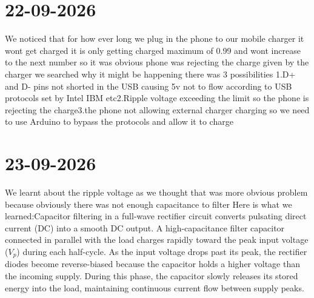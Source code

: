 \documentclass{article}
\begin{document}
	\section{22-09-2026}
	We noticed that for how ever long we plug in the phone to our mobile charger it wont get charged it is only getting charged maximum of 0.99 and wont increase to the next number so it was obvious phone was rejecting the charge given by the charger we searched why it might be happening there was 3 possibilities \newline 1.D+ and D- pins not shorted in the USB causing 5v not to flow according to USB protocols set by Intel IBM etc\newline 2.Ripple voltage exceeding the limit so the phone is rejecting the charge\newline 3.the phone not allowing external charger charging so we need to use Arduino to bypass the protocols and allow it to charge
	\section{23-09-2026}
	We learnt about the ripple voltage as we thought that was more obvious problem because obviously there was not enough capacitance to filter Here is what we learned:\newline Capacitor filtering in a full-wave rectifier circuit converts pulsating direct current (DC) into a smooth DC output. A high-capacitance filter capacitor connected in parallel with the load charges rapidly toward the peak input voltage ($V_p$) during each half-cycle. As the input voltage drops past its peak, the rectifier diodes become reverse-biased because the capacitor holds a higher voltage than the incoming supply. During this phase, the capacitor slowly releases its stored energy into the load, maintaining continuous current flow between supply peaks.
	
\end{document}
